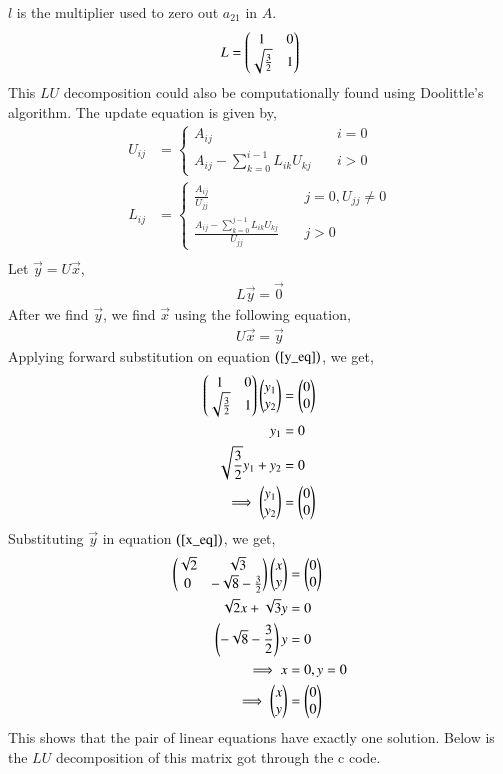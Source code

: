 \documentclass[journal]{IEEEtran}
\begin{document}
$l$ is the multiplier used to zero out $a_{21}$ in $A$.
\begin{align}
	L = \begin{pmatrix}1 & 0 \\ \sqrt{\frac{3}{2}} & 1\end{pmatrix}
\end{align}
This $LU$ decomposition could also be computationally found using Doolittle's algorithm. The update equation is given by,
\begin{align}
	U_{ij} &= \begin{cases}
		A_{ij} & \quad i = 0\\
		A_{ij} - \sum_{k = 0}^{i - 1} L_{ik} U_{kj} & \quad i > 0
	\end{cases}\\
	L_{ij} &= \begin{cases}
		\frac{A_{ij}}{U_{jj}} & \quad j = 0, U_{jj} \neq 0\\
		\frac{A_{ij} - \sum_{k = 0}^{j - 1} L_{ik} U_{kj}}{U_{jj}} & \quad j > 0
	\end{cases}\\
\end{align}
\newline
Let $\vec{y} = U\vec{x}$,
\begin{align}
	L\vec{y} = \vec{0} \label{y_eq}
\end{align}
After we find $\vec{y}$, we find $\vec{x}$ using the following equation,
\begin{align}
	U\vec{x} = \vec{y} \label{x_eq}
\end{align}
Applying forward substitution on equation $\left(\ref{y_eq}\right)$, we get,
\begin{align}
	\begin{pmatrix}1 & 0\\\sqrt{\frac{3}{2}} & 1\end{pmatrix}\begin{pmatrix}y_1\\y_2\end{pmatrix} &= \begin{pmatrix}0\\0\end{pmatrix}\\
	y_1 &= 0\\
	\sqrt{\frac{3}{2}}y_1 + y_2 &= 0\\
	\implies \begin{pmatrix}y_1\\y_2\end{pmatrix} &= \begin{pmatrix}0\\0\end{pmatrix}
\end{align}
Substituting $\vec{y}$ in equation $\left(\ref{x_eq}\right)$, we get,
\begin{align}
	\begin{pmatrix}\sqrt{2} & \sqrt{3}\\0 & -\sqrt{8} - \frac{3}{2}\end{pmatrix} \begin{pmatrix}x\\y\end{pmatrix} &= \begin{pmatrix}0\\0\end{pmatrix}\\
	\sqrt{2}x + \sqrt{3}y &= 0\\
	\left(-\sqrt{8} - \frac{3}{2}\right)y &= 0\\
	\implies x &= 0, y = 0\\
	\implies \begin{pmatrix}x\\y\end{pmatrix} &= \begin{pmatrix}0\\0\end{pmatrix}
\end{align}
This shows that the pair of linear equations have exactly one solution.
\newpage
Below is the $LU$ decomposition of this matrix got through the c code.
\end{document}
